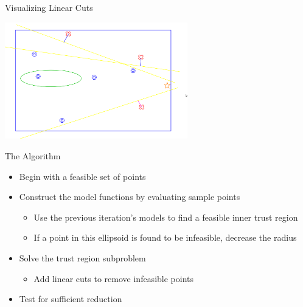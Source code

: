 \documentclass{beamer}
\begin{document}


\begin{frame}{Visualizing Linear Cuts}
\begin{center}
    \includegraphics[width=300px]{images/cut_infeasible_points.png}
\end{center}
\end{frame}



\begin{frame}{The Algorithm}
    \begin{itemize}
        \item Begin with a feasible set of points
        \item Construct the model functions by evaluating sample points
            \begin{itemize}
                \item Use the previous iteration's models to find a feasible inner trust region
                \item If a point in this ellipsoid is found to be infeasible, decrease the radius
            \end{itemize}
        \item Solve the trust region subproblem
            \begin{itemize}
                \item Add linear cuts to remove infeasible points
            \end{itemize}
        \item Test for sufficient reduction
    \end{itemize}
\end{frame}
\end{document}
